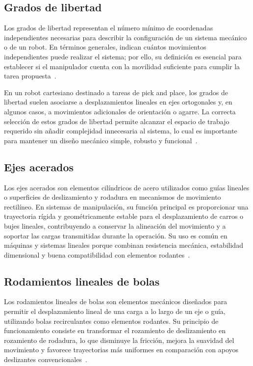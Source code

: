 \subsection{Grados de libertad}
Los grados de libertad representan el número mínimo de coordenadas independientes necesarias para describir la configuración de un sistema mecánico o de un robot. En términos generales, indican cuántos movimientos independientes puede realizar el sistema; por ello, su definición es esencial para establecer si el manipulador cuenta con la movilidad suficiente para cumplir la tarea propuesta~\cite{lynch2017modern,correll2022autonomous}.

En un robot cartesiano destinado a tareas de pick and place, los grados de libertad suelen asociarse a desplazamientos lineales en ejes ortogonales y, en algunos casos, a movimientos adicionales de orientación o agarre. La correcta selección de estos grados de libertad permite alcanzar el espacio de trabajo requerido sin añadir complejidad innecesaria al sistema, lo cual es importante para mantener un diseño mecánico simple, robusto y funcional~\cite{lynch2017modern}.

\subsection{Ejes acerados}
Los ejes acerados son elementos cilíndricos de acero utilizados como guías lineales o superficies de deslizamiento y rodadura en mecanismos de movimiento rectilíneo. En sistemas de manipulación, su función principal es proporcionar una trayectoria rígida y geométricamente estable para el desplazamiento de carros o bujes lineales, contribuyendo a conservar la alineación del movimiento y a soportar las cargas transmitidas durante la operación. Su uso es común en máquinas y sistemas lineales porque combinan resistencia mecánica, estabilidad dimensional y buena compatibilidad con elementos rodantes~\cite{thkSTShaft,nb2018life}.

\subsection{Rodamientos lineales de bolas}
Los rodamientos lineales de bolas son elementos mecánicos diseñados para permitir el desplazamiento lineal de una carga a lo largo de un eje o guía, utilizando bolas recirculantes como elementos rodantes. Su principio de funcionamiento consiste en transformar el rozamiento de deslizamiento en rozamiento de rodadura, lo que disminuye la fricción, mejora la suavidad del movimiento y favorece trayectorias más uniformes en comparación con apoyos deslizantes convencionales~\cite{thkLinearBushing,nbCatalog176E}.


